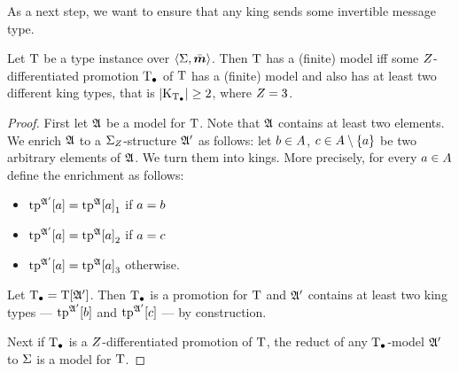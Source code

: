 As a next step, we want to ensure that any king sends some invertible message
type.
\begin{remark}
Let $\mathrm{T}$ be a type instance over $\left\langle \mathrm{\Sigma},\bar{\bm{m}} \right\rangle$.
Then $\mathrm{T}$ has a (finite) model iff some $Z$-differentiated promotion $\mathrm{T}_{\bullet}$
of $\mathrm{T}$ has a (finite) model and also has at least two different king types,
that is $\left|{\mathrm{K}}_{\mathrm{T}_{\bullet}}\right|\geq2$, where $Z = 3$.
\end{remark}
\begin{proof}
First let $\mathfrak{A}$ be a model for $\mathrm{T}$. Note that $\mathfrak{A}$ contains at least two
elements.
We enrich $\mathfrak{A}$ to a ${\mathrm{\Sigma}}_{Z}$-structure $\mathfrak{A'}$ as follows:
let $b\in A$, $c\in A\setminus\left\{a\right\}$ be two arbitrary elements of
$\mathfrak{A}$. We turn them into kings.
More precisely, for every $a\in A$ define the enrichment as follows:
\begin{itemize}
  \item $\operatorname{tp}^{\mathfrak{A'}}[a] = {\operatorname{tp}^{\mathfrak{A}}[a]}_{1}$ if $a=b$
  \item $\operatorname{tp}^{\mathfrak{A'}}[a] = {\operatorname{tp}^{\mathfrak{A}}[a]}_{2}$ if $a=c$
  \item $\operatorname{tp}^{\mathfrak{A'}}[a] = {\operatorname{tp}^{\mathfrak{A}}[a]}_{3}$ otherwise.
\end{itemize}
Let $\mathrm{T}_{\bullet} = \mathrm{T}[\mathfrak{A'}]$.
Then $\mathrm{T}_{\bullet}$ is a promotion for $\mathrm{T}$ and $\mathfrak{A'}$ contains at least two king
types --- $\operatorname{tp}^{\mathfrak{A'}}[b]$ and $\operatorname{tp}^{\mathfrak{A'}}[c]$ --- by construction.

Next if $\mathrm{T}_{\bullet}$ is a $Z$-differentiated promotion of $\mathrm{T}$,
the reduct of any $\mathrm{T}_{\bullet}$-model $\mathfrak{A'}$ to $\mathrm{\Sigma}$ is a model for $\mathrm{T}$.
\end{proof}


